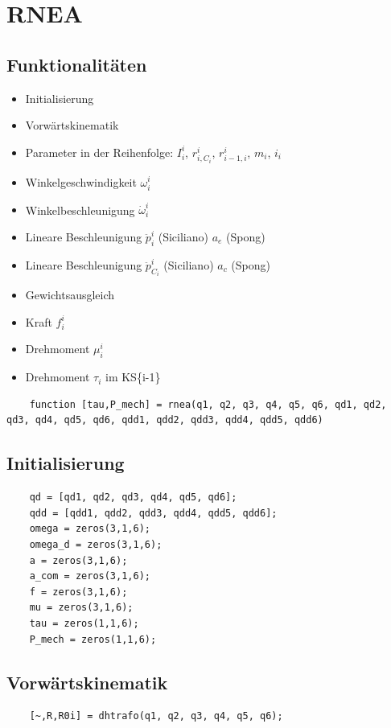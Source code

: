 \section{RNEA}
\label{add:rnea}
%
\subsection*{Funktionalitäten}
%
\begin{itemize}
	\setlength{\itemsep}{-1ex}
	\item Initialisierung
	\item Vorwärtskinematik
	\item Parameter in der Reihenfolge: $I^{i}_{i}$, $r^{i}_{i,C_i}$, $r^{i}_{i-1,i}$, $m_i$, $i_i$
	\item Winkelgeschwindigkeit $\omega^{i}_i$
	\item Winkelbeschleunigung $\dot\omega^{i}_i$
	\item Lineare Beschleunigung $\ddot p^{i}_i$ (Siciliano) $a_e$ (Spong)
	\item Lineare Beschleunigung $\ddot p^{i}_{C_i}$ (Siciliano) $a_c$ (Spong)
	\item Gewichtsausgleich
	\item Kraft $f^{i}_i$
	\item Drehmoment $\mu^{i}_i$
	\item Drehmoment $\tau_i$ im KS\{i-1\}
\end{itemize}
\begin{lstlisting}
	function [tau,P_mech] = rnea(q1, q2, q3, q4, q5, q6, qd1, qd2, qd3, qd4, qd5, qd6, qdd1, qdd2, qdd3, qdd4, qdd5, qdd6)
\end{lstlisting}
%
\subsection*{Initialisierung}
%
\begin{lstlisting}
	qd = [qd1, qd2, qd3, qd4, qd5, qd6];
	qdd = [qdd1, qdd2, qdd3, qdd4, qdd5, qdd6];
	omega = zeros(3,1,6);
	omega_d = zeros(3,1,6);
	a = zeros(3,1,6);
	a_com = zeros(3,1,6);
	f = zeros(3,1,6);
	mu = zeros(3,1,6);
	tau = zeros(1,1,6);
	P_mech = zeros(1,1,6);
\end{lstlisting}
%
\subsection*{Vorwärtskinematik}
%
\begin{lstlisting}
	[~,R,R0i] = dhtrafo(q1, q2, q3, q4, q5, q6);
\end{lstlisting}
%
